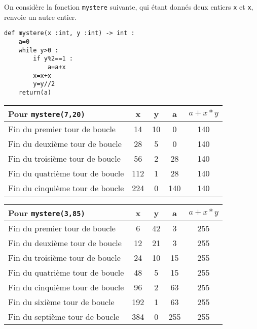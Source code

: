 \ifprof
\vspace{1cm}
\else
\begin{multicols}{2}
\fi

\exer{}
\setcounter{numques}{0}

On considère la fonction \texttt{mystere} suivante, qui étant donnés deux entiers \texttt{x} et \texttt{x}, renvoie un autre
entier.
\begin{lstlisting}
def mystere(x :int, y :int) -> int :
    a=0
    while y>0 :
        if y%2==1 :
            a=a+x
        x=x+x
        y=y//2
    return(a)
\end{lstlisting}

\ifprof
\begin{corrige}
\begin{center}
\begin{tabular}{l c c c c }
\hline
Pour \texttt{mystere(7,20)} & x  & y & a & $a+x*y$ \\
\hline
\hline
Fin du premier tour de boucle     &14 & 10 & 0 & 140 \\ \hline
Fin du deuxième tour de boucle  & 28 & 5 & 0 & 140\\ \hline
Fin du troisième tour de boucle   & 56 & 2 & 28 & 140\\ \hline
Fin du quatrième tour de boucle &  112 & 1 & 28 & 140\\ \hline
Fin du cinquième tour de boucle & 224 & 0 & 140 & 140\\ \hline
\end{tabular}
\end{center}
\end{corrige}
\else
\fi

\ifprof
\begin{corrige}
\begin{tabular}{l c c c c }
\hline
Pour \texttt{mystere(3,85)} & x  & y & a & $a+x*y$ \\
\hline
\hline
Fin du premier tour de boucle     & 6    & 42 & 3     & 255\\ \hline
Fin du deuxième tour de boucle & 12   & 21 &3      & 255 \\ \hline
Fin du troisième tour de boucle  & 24   & 10 & 15   & 255 \\ \hline
Fin du quatrième tour de boucle & 48   & 5 & 15     & 255 \\ \hline
Fin du cinquième tour de boucle & 96   & 2  & 63    & 255 \\ \hline
Fin du sixième tour de boucle     & 192  & 1 & 63    & 255 \\ \hline
Fin du septième tour de boucle   & 384 & 0 &  255 & 255 \\ \hline
\end{tabular}
\end{corrige}
\else
\fi


\end{multicols}

